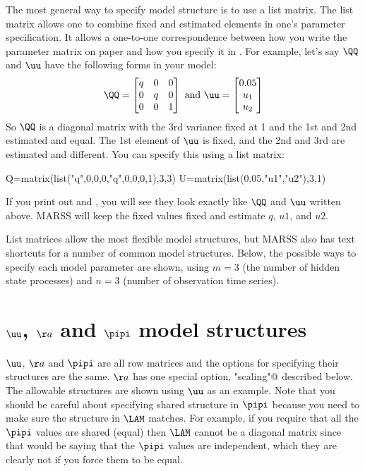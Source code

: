 The most general way to specify model structure is to use a list matrix.  The list matrix allows one to combine fixed and estimated elements in one's parameter specification.  It allows a one-to-one correspondence between how you write the parameter matrix on paper and how you specify it in \R.  For example, let's say $\QQ$ and $\uu$ have the following forms in your model:
\begin{equation*}
\QQ=
\begin{bmatrix}
q&0&0\\
0&q&0\\
0&0&1
\end{bmatrix}
\text{ and }
\uu=
\begin{bmatrix}
0.05\\
u_1\\
u_2
\end{bmatrix}
\end{equation*}
So $\QQ$ is a diagonal matrix with the 3rd variance fixed at 1 and the 1st and 2nd estimated and equal.  The 1st element of $\uu$ is fixed, and the 2nd and 3rd are estimated and different. You can specify this using a list matrix:
 \begin{Schunk}
\begin{Sinput}
Q=matrix(list("q",0,0,0,"q",0,0,0,1),3,3)
U=matrix(list(0.05,"u1","u2"),3,1)
\end{Sinput}
\end{Schunk}
If you print out \verb@Q@ and \verb@U@, you will see they look exactly like $\QQ$ and $\uu$ written above.  MARSS will keep the fixed values fixed and estimate $q$, $u1$, and $u2$.

List matrices allow the most flexible model structures, but MARSS also has text shortcuts for a number of common model structures.  Below, the possible ways to specify each model parameter are shown, using $m=3$ (the number of hidden state processes) and $n=3$ (number of observation time series).


\section{$\uu$, $\aa$ and $\pipi$ model structures}

$\uu$, $\aa$ and $\pipi$ are all row matrices and the options for specifying their structures are the same.  $\aa$ has one special option, \verb@"scaling"@ described below.  The allowable structures are shown using $\uu$ as an example.   Note that you should be careful about specifying shared structure in $\pipi$ because you need to make sure the structure in $\LAM$ matches.  For example, if you require that all the $\pipi$ values are shared (equal) then $\LAM$ cannot be a diagonal matrix since that would be saying that the $\pipi$ values are independent, which they are clearly not if you force them to be equal.

